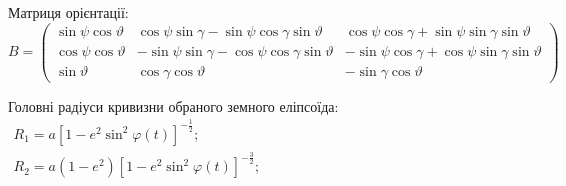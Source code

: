 \documentclass[ucs,compress]{beamer}    %
\begin{document}
\begin{frame}[plain,shrink=10]
Матриця орієнтації:\\
$B%
=\left(\begin{array}{ccc} 
{\sin \psi \cos \vartheta } & {\cos \psi \sin \gamma -\sin \psi \cos \gamma \sin \vartheta } & {\cos \psi \cos 
\gamma +\sin \psi \sin \gamma \sin \vartheta } \\ 
{\cos \psi \cos \vartheta } & {-\sin \psi \sin \gamma -\cos \psi \cos \gamma \sin \vartheta } & {-\sin \psi \cos \gamma +\cos \psi \sin \gamma \sin \vartheta } \\ 
{\sin \vartheta } & {\cos \gamma \cos \vartheta } & {-\sin \gamma \cos \vartheta } \end{array}\right)$ 

Головні радіуси кривизни обраного земного еліпсоїда:\\
$\begin{array}{l} 
{R_{1} =a\left[1-e^{2} \sin ^{2} \varphi (t)\right]^{-\frac{1}{2}};} \\ 
{R_{2} =a\left(1-e^{2} \right)\left[1-e^{2} \sin ^{2} \varphi (t)\right]^{- \frac{3}{2} } ;} 
\end{array}$
\end{frame}

\end{document}
